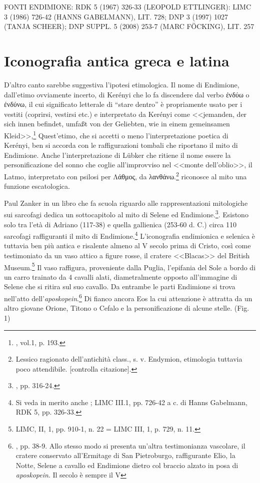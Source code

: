 \documentclass[12pt,a4paper,openright, oneside]{book}
\begin{document}
FONTI ENDIMIONE: RDK 5 (1967) 326-33 (LEOPOLD ETTLINGER): LIMC 3 (1986) 726-42 (HANNS GABELMANN), LIT. 728; DNP 3 (1997) 1027 (TANJA SCHEER); DNP SUPPL. 5 (2008) 253-7 (MARC F\"OCKING), LIT. 257

 \section{Iconografia antica greca e latina}
 D'altro canto sarebbe suggestiva l'ipotesi etimologica. Il nome di Endimione, dall'etimo ovviamente incerto, di Kerényi che lo fa discendere dal verbo ἐνδύω o ἐνδύνω, il cui significato letterale di ``stare dentro'' è propriamente usato per i vestiti (coprirsi, vestirsi etc.) e interpretato da Kerényi come <<jemanden, der sich innen befindet, umfa\ss t von der Geliebten, wie in einem gemeinsamen Kleid>>,\footnote{\cite{Kerenyi}, vol.1, p. 193.} Quest'etimo, che si accetti o meno l'interpretazione poetica di Kerényi, ben si accorda con le raffigurazioni tombali che riportano il mito di Endimione. Anche l'interpretazione di L\"ubker che ritiene il nome essere  la personificazione del sonno che coglie all'improvviso nel <<monte dell'oblio>>, il Latmo, interpretato con psilosi per Λάθμος, da λανθάνω.\footnote{Lessico ragionato dell'antichità class., s. v. Endymion, etimologia tuttavia poco attendibile. [controlla citazione].} riconosce al mito una funzione escatologica. 
 
 Paul Zanker in un libro che fa scuola riguardo alle rappresentazioni mitologiche sui sarcofagi dedica un sottocapitolo al mito di Selene ed Endimione.\footnote{\cite{Zanker}, pp. 316-24.}. Esistono solo tra l'età di Adriano (117-38) e quella gallienica (253-60 d. C.) circa 110 sarcofagi raffiguranti il mito di Endimione.\footnote{Si veda in merito anche \cite{Sichtermann}; LIMC III.1, pp. 726-42 a c. di Hanns Gabelmann, RDK 5, pp. 326-33.} L'iconografia endimionica e selenica è tuttavia ben più antica e risalente almeno al V secolo prima di Cristo, così come testimoniato da un vaso attico a figure rosse, il cratere <<Blacas>> del British Museum.\footnote{LIMC, II, 1, pp. 910-1, n. 22 = LIMC III, 1, p. 729, n. 11.} Il vaso raffigura, proveniente dalla Puglia, l'epifania del Sole a bordo di un carro trainato da 4 cavalli alati, diametralmente opposto all'immagine di Selene che si ritira sul suo cavallo. Da entrambe le parti Endimione si trova nell'atto dell'\textit{aposkopein}.\footnote{\cite{Jucker}, pp. 38-9. Allo stesso modo si presenta un'altra testimonianza vascolare, il cratere conservato all'Ermitage di San Pietroburgo, raffigurante Elio, la Notte, Selene a cavallo ed Endimione dietro col braccio alzato in posa di \textit{aposkopein}. Il secolo è sempre il V  } Di fianco ancora Eos la cui attenzione è attratta da un altro giovane Orione, Titono o Cefalo e la personificazione di alcune stelle. (Fig. 1) 
 
\end{document}
